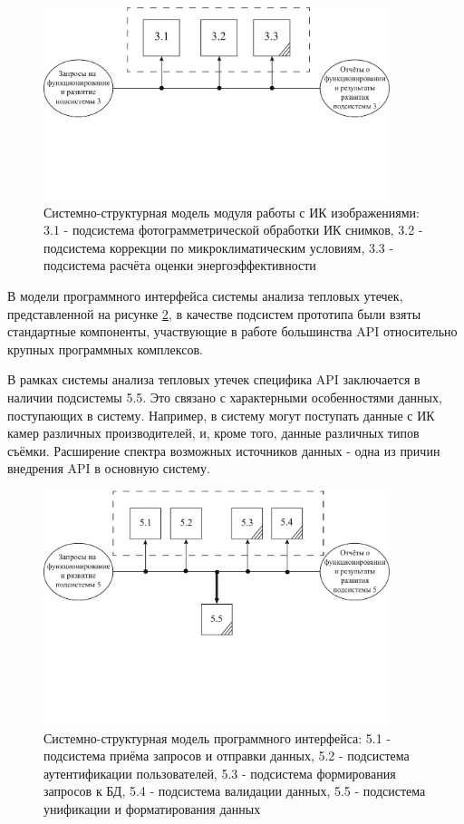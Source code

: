 	\begin{figure}[t!]
      \centering
      \includegraphics[width=0.9\textwidth]{images/ssm/3}
      \caption{Системно-структурная модель модуля работы с ИК изображениями: 3.1 - подсистема фотограмметрической обработки ИК снимков, 3.2 - подсистема коррекции по микроклиматическим условиям, 3.3 - подсистема расчёта оценки энергоэффективности}
      \label{ssm:3}
    \end{figure}

\par
	В модели программного интерфейса системы анализа тепловых утечек, представленной на рисунке \ref{ssm:5}, в качестве подсистем прототипа были взяты стандартные компоненты, участвующие в работе большинства API относительно крупных программных комплексов. 
	
	В рамках системы анализа тепловых утечек специфика API заключается в наличии подсистемы 5.5. Это связано с характерными особенностями данных, поступающих в систему. Например, в систему могут поступать данные с ИК камер различных производителей, и, кроме того, данные различных типов съёмки. Расширение спектра возможных источников данных - одна из причин внедрения API в основную систему.

\pagebreak

	\begin{figure}[t!]
      \centering
      \includegraphics[width=0.9\textwidth]{images/ssm/5}
      \caption{Системно-структурная модель программного интерфейса: 5.1 - подсистема приёма запросов и отправки данных,  5.2 - подсистема аутентификации пользователей, 5.3 - подсистема формирования запросов к БД, 5.4 - подсистема валидации данных, 5.5 - подсистема унификации и форматирования данных}
      \label{ssm:5}
    \end{figure}

